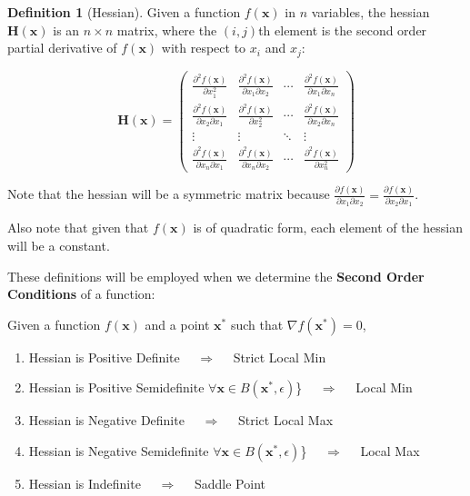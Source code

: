 \documentclass[
]{book}
\providecommand{\tightlist}{%
  \setlength{\itemsep}{0pt}\setlength{\parskip}{0pt}}
\theoremstyle{definition}
\newtheorem{definition}{Definition}[chapter]
\theoremstyle{definition}
\theoremstyle{definition}
\theoremstyle{remark}
\begin{document}
\begin{definition}[Hessian]
\protect\hypertarget{def:unnamed-chunk-56}{}{\label{def:unnamed-chunk-56} {} }
Given a function \(f(\mathbf{x})\) in \(n\) variables, the hessian \(\mathbf{H(x)}\) is
an \(n\times n\) matrix, where the \((i,j)\)th element is the second order
partial derivative of \(f(\mathbf{x})\) with respect to \(x_i\) and \(x_j\):

\[\mathbf{H(x)}=\begin{pmatrix}
\frac{\partial^2 f(\mathbf{x})}{\partial x_1^2}&\frac{\partial^2f(\mathbf{x})}{\partial x_1 \partial x_2}&
\cdots & \frac{\partial^2 f(\mathbf{x})}{\partial x_1 \partial x_n}\\[9pt]
\frac{\partial^2 f(\mathbf{x})}{\partial x_2 \partial x_1}&\frac{\partial^2f(\mathbf{x})}{\partial x_2^2}&
\cdots & \frac{\partial^2 f(\mathbf{x})}{\partial x_2 \partial x_n}\\
\vdots & \vdots & \ddots & \vdots \\[3pt]
\frac{\partial^2 f(\mathbf{x})}{\partial x_n \partial x_1}&\frac{\partial^2f(\mathbf{x})}{\partial x_n \partial x_2}&
\cdots & \frac{\partial^2 f(\mathbf{x})}{\partial x_n^2}\end{pmatrix}\]
\end{definition}

Note that the hessian will be a symmetric matrix because \(\frac{\partial f(\mathbf{x})}{\partial x_1\partial x_2} = \frac{\partial f(\mathbf{x})}{\partial x_2\partial x_1}\).

Also note that given that \(f(\mathbf{x})\) is of quadratic form, each element of the hessian will be a constant.

These definitions will be employed when we determine the \textbf{Second Order Conditions} of a function:

Given a function \(f(\mathbf{x})\) and a point \(\mathbf{x}^*\) such that \(\nabla f(\mathbf{x}^*)=0\),

\begin{enumerate}
\def\labelenumi{\arabic{enumi}.}
\tightlist
\item
  Hessian is Positive Definite \(\quad \Longrightarrow \quad\) Strict Local Min
\item
  Hessian is Positive Semidefinite \(\forall \mathbf{x}\in B(\mathbf{x}^*,\epsilon)\)\} \(\quad \Longrightarrow \quad\) Local Min
\item
  Hessian is Negative Definite \(\quad \Longrightarrow \quad\) Strict Local Max
\item
  Hessian is Negative Semidefinite \(\forall \mathbf{x}\in B(\mathbf{x}^*,\epsilon)\)\} \(\quad \Longrightarrow \quad\) Local Max
\item
  Hessian is Indefinite \(\quad \Longrightarrow \quad\) Saddle Point
\end{enumerate}
\end{document}
